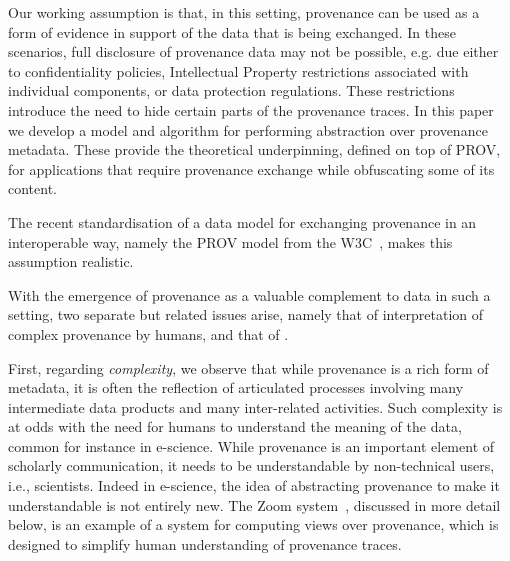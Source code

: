 %
%
%
Our working assumption is that, in this setting, provenance can be used as a form of evidence in support of the data that is being exchanged. 
%
In these scenarios, full disclosure of provenance data may not be possible, e.g. due either to confidentiality policies, Intellectual Property restrictions associated with individual components, or data protection regulations. These restrictions introduce the need to hide certain parts of the provenance traces. 
%
In this paper we develop a model and algorithm for performing  abstraction over provenance metadata. These provide the theoretical underpinning, defined on top of PROV, for applications that require provenance exchange while obfuscating some of its content.


The recent standardisation of a data model for exchanging provenance in an interoperable way, namely the PROV model from the W3C~\citep{w3c-prov-dm}, makes this assumption realistic.
%



With the emergence of provenance as a valuable complement to data in such a setting, two separate but related issues arise, namely that of interpretation of complex provenance by humans,  and that of .
  
%
First, regarding \textit{complexity}, we observe that while provenance is a rich form of metadata, it is often the reflection of articulated processes involving many intermediate data products and many inter-related activities. 
%
Such complexity is at odds with the need for humans to understand the meaning of the data, common for instance in e-science. 
While provenance is an important element of scholarly communication, it needs to be understandable by non-technical users, i.e., scientists. 
%
Indeed in e-science, the idea of abstracting provenance to make it understandable is not entirely new.
%
The Zoom system~\citep{DBLP:conf/icde/BitonBDH08}, discussed in more detail below, is an example of a system for computing views over provenance, which is designed to simplify human understanding of provenance traces.
%




